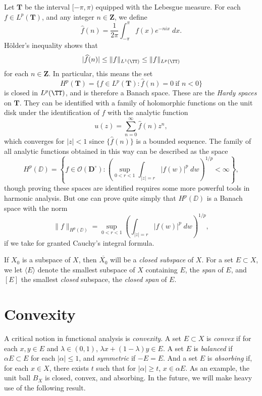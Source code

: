 \begin{example}
    Let $\mathbf{T}$ be the interval $[-\pi,\pi)$ equipped with the Lebesgue measure. For each $f \in L^p(\mathbf{T})$, and any integer $n \in \mathbf{Z}$, we define
    \[ \widehat{f}(n) = \frac{1}{2\pi} \int_{-\pi}^\pi f(x) e^{-nix}\; dx. \]
    H\"{o}lder's inequality shows that
    \[ |\widehat{f}(n)| \leq \| f \|_{L^1(\TT)} \leq \| f \|_{L^p(\TT)} \]
    for each $n \in \mathbf{Z}$. In particular, this means the set
    \[ H^p(\mathbf{T}) = \{ f \in L^p(\mathbf{T}) : \widehat{f}(n) = 0\ \text{if $n < 0$} \} \]
    is closed in $L^p(\TT)$, and is therefore a Banach space. These are the {\it Hardy spaces} on $\mathbf{T}$. They can be identified with a family of holomorphic functions on the unit disk under the identification of $f$ with the analytic function
    \[ u(z) = \sum_{n = 0}^\infty \widehat{f}(n) z^n, \]
    which converges for $|z| < 1$ since $\{ \widehat{f}(n) \}$ is a bounded sequence. The family of all analytic functions obtained in this way can be described as the space
    \[ H^p(\DD) = \left\{ f \in \mathcal{O}(\mathbf{D}^\circ) : \left( \sup_{0 < r < 1} \int_{|z| = r} |f(w)|^p\; dw \right)^{1/p} < \infty \right\}, \]
    though proving these spaces are identified requires some more powerful tools in harmonic analysis. But one can prove quite simply that $H^p(\DD)$ is a Banach space with the norm
    \[ \| f \|_{H^p(\DD)} = \sup_{0 < r < 1} \left( \int_{|z| = r} |f(w)|^p\; dw \right)^{1/p}, \]
    if we take for granted Cauchy's integral formula.
\end{example}

If $X_0$ is a subspace of $X$, then $\overline{X_0}$ will be a \emph{closed subspace} of $X$. For a set $E \subset X$, we let $\langle E \rangle$ denote the smallest subspace of $X$ containing $E$, the \emph{span} of $E$, and $[E]$ the smallest {\it closed} subspace, the \emph{closed span} of $E$.

\section{Convexity}

A critical notion in functional analysis is {\it convexity}. A set $E \subset X$ is {\it convex} if for each $x,y \in E$ and $\lambda \in (0,1)$, $\lambda x + (1 - \lambda) y \in E$. A set $E$ is {\it balanced} if $\alpha E \subset E$ for each $|\alpha| \leq 1$, and {\it symmetric} if $-E = E$. And a set $E$ is {\it absorbing} if, for each $x \in X$, there exists $t$ such that for $|\alpha| \geq t$, $x \in \alpha E$. As an example, the unit ball $B_X$ is closed, convex, and absorbing. In the future, we will make heavy use of the following result.

